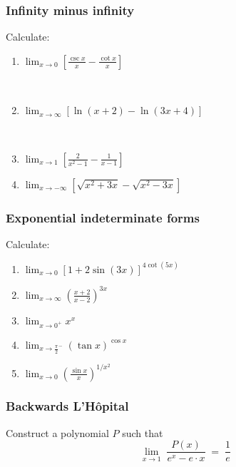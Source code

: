 \documentclass[14pt]{beamer}
\begin{document}
\begin{frame}[t]
	\frametitle{Infinity minus infinity}

	Calculate:

	\begin{enumerate}
		\item $\displaystyle \lim_{x \to 0}\left[ \frac{\csc x}{x}- \frac{\cot x}{x}\right
			]$

			\

		\item $\displaystyle \lim_{x \to \infty}\left[ \ln (x+2) - \ln(3x+4) \right]$

			\

		\item $\displaystyle \lim_{x \to 1}\left[ \frac{2}{x^{2}-1}- \frac{1}{x-1}\right
			]$

		\item $\displaystyle \lim_{x \to - \infty}\left[ \sqrt{x^{2}+3x}- \sqrt{x^{2}-3x}
			\right]$
	\end{enumerate}
\end{frame}

\begin{frame}[t]
	\frametitle{Exponential indeterminate forms}

	Calculate:

	\begin{enumerate}
		\item $\displaystyle \lim_{x \to 0}\left[ 1 + 2 \sin(3x) \right]^{4 \cot (5x)}$

		\item $\displaystyle \lim_{x \to \infty }\left( \frac{x+2}{x-2}\right)^{3x}$

		\item $\displaystyle \lim_{x \to 0^+}x^{x}$

		\item $\displaystyle \lim_{x \to {\frac{\pi}{2}}^{-}}\left( \tan x \right)^{\cos
			x}$

		\item $\displaystyle \lim_{x \to 0}\left( \frac{\sin x}{x}\right)^{1 /x^2}$
	\end{enumerate}
\end{frame}

\begin{frame}[t]
	\frametitle{Backwards L'H\^{o}pital}

	Construct a polynomial $P$ such that
	\[
		\lim_{x \to 1}\; \frac{P(x)}{e^{x}- e \cdot x}\; = \; \frac{1}{e}
	\]
\end{frame}
\end{document}
